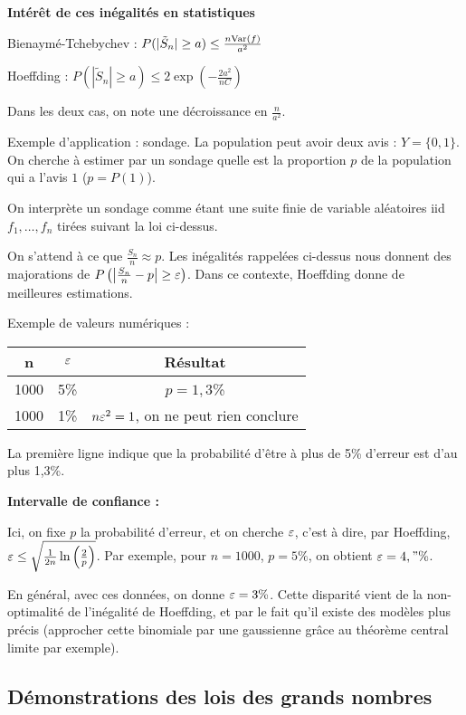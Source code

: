 \documentclass[10pt,a4paper,notitlepage ]{report}
\begin{document}
\begin{rem}
	\textbf{Intérêt de ces inégalités en statistiques}
	
	Bienaymé-Tchebychev : $P(|\tilde S_n| \ge a) \le \frac{n\mathrm{Var}(f)}{a^2}$
	
	Hoeffding : $P(|\tilde S_n| \ge a) \le 2\exp(-\frac{2a^2}{nC})$
	
	Dans les deux cas, on note une décroissance en $\frac n {a^2}$.

	Exemple d'application : sondage. La population peut avoir deux avis : $Y = \{ 0, 1\}$. On cherche à estimer par un sondage quelle est la proportion $p$ de la population qui a l'avis $1$ ($p=P(1)$).
	
	On interprète un sondage comme étant une suite finie de variable aléatoires iid $f_1, \dots, f_n$ tirées suivant la loi ci-dessus.
	
	On s'attend à ce que $\frac {S_n} n \approx p$. Les inégalités rappelées ci-dessus nous donnent des majorations de $P\left(\left|\frac{S_n} n - p \right| \ge \varepsilon \right)$. Dans ce contexte, Hoeffding donne de meilleures estimations.
	
	Exemple de valeurs numériques :
	\begin{center}
		\begin{tabular}{|c|c||c|}
			\hline
			n & $\varepsilon$ & Résultat \\
			\hline
			1000 & 5\% & $p=1,3$\% \\
			\hline
			1000 & 1\% & $n\varepsilon^2 =1$, on ne peut rien conclure \\
			\hline
		\end{tabular}
	\end{center}

	La première ligne indique que la probabilité d'être à plus de 5\% d'erreur est d'au plus 1,3\%.
	
	\textbf{Intervalle de confiance :}
	
	Ici, on fixe $p$ la probabilité d'erreur, et on cherche $\varepsilon$, c'est à dire, par Hoeffding, $\varepsilon \le \sqrt{\frac 1 {2n} \ln\left(\frac 2 p \right)}$. Par exemple, pour $n=1000$, $p=5\%$, on obtient $\varepsilon=4,"\%$.
	
	En général, avec ces données, on donne $\varepsilon = 3\%$. Cette disparité vient de la non-optimalité de l'inégalité de Hoeffding, et par le fait qu'il existe des modèles plus précis (approcher cette binomiale par une gaussienne grâce au théorème central limite par exemple).
\end{rem}

\subsection{Démonstrations des lois des grands nombres}
\end{document}
